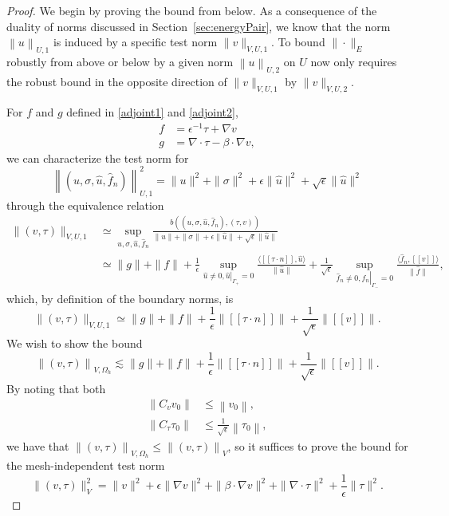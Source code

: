 \documentclass[11pt,onecolumn]{scrartcl}
\newcommand{\secref}[1]{\ref{sec:#1}}
\newcommand{\nor}[1]{\left\| #1 \right\|}
\newcommand{\LRs}[1]{\left[ #1 \right]}
\newcommand{\jump}[1] {\ensuremath{\LRs{\![#1]\!}}}
\newcommand{\Oh}{\Omega_h}
\newcommand{\grad}{\nabla}
\renewcommand{\div}{\grad \cdot}
\begin{document}
\begin{proof}
We begin by proving the bound from below. As a consequence of the duality of norms discussed in Section~\secref{energyPair}, we know that the norm $\left\| u \right\|_{U,1}$ is induced by a specific test norm $\| v  \|_{V,U,1}$.  To bound $\|\cdot\|_E$ robustly from above or below by a given norm $\left\| u \right\|_{U,2}$ on $U$ now only requires the robust bound in the opposite direction of $\| v \|_{V,U,1}$ by $\|v\|_{V,U,2}$. 

For $f$ and $g$ defined in \eqref{adjoint1} and \eqref{adjoint2},
\begin{align*}
f &= \epsilon^{-1}\tau + \grad v  \\
g &=\div \tau - \beta\cdot \grad v,
\end{align*} 
we can characterize the test norm for 
\[
\left\|\left(u,\sigma,\widehat{u},\widehat{f}_n\right)\right\|_{U,1}^2 = \|u\|^2 + \|\sigma\|^2 + \epsilon\|\widehat{u}\|^2+ \sqrt{\epsilon}\|\widehat{u}\|^2
\]
through the equivalence relation
\begin{align*}
\|\left(v,\tau\right)\|_{V,U,1} &\simeq \sup_{u,\sigma,\widehat{u},\widehat{f}_n}\frac{b\left(\left(u,\sigma,\widehat{u},\widehat{f}_n\right),\left(\tau,v\right)\right)}{\|u\| + \|\sigma\| + \epsilon\|\widehat{u}\|+ \sqrt{\epsilon}\|\widehat{u}\|}\\
& \simeq \|g\| + \|f\| + \frac{1}{\epsilon}\sup_{\widehat{u}\neq 0, \left.\widehat{u}\right|_{\Gamma_+} = 0} \frac{\langle \jump{\tau\cdot n}, \widehat{u}\rangle}{\|\widehat{u}\|} + \frac{1}{\sqrt{\epsilon}}\sup_{\widehat{f}_n\neq 0, \left.\widehat{f}_n\right|_{\Gamma_-}=0}\frac{\langle \widehat{f}_n, \jump{v}\rangle}{\|\widehat{f}\|},
\end{align*}
which, by definition of the boundary norms, is 
\[
\|\left(v,\tau\right)\|_{V,U,1} \simeq \|g\| + \|f\| + \frac{1}{\epsilon}\|\jump{\tau\cdot n}\| + \frac{1}{\sqrt{\epsilon}}\|\jump{v}\|.
\]
We wish to show the bound
\[
\nor{\left(v,\tau\right)}_{V,\Oh} \lesssim \|g\| + \|f\| + \frac{1}{\epsilon}\|\jump{\tau\cdot n}\| + \frac{1}{\sqrt{\epsilon}}\|\jump{v}\|.
\]
By noting that both 
\begin{align*}
\nor{C_vv_0} &\leq \nor{v_0},\\
\nor{C_\tau\tau_0} &\leq \frac{1}{\sqrt{\epsilon}}\nor{\tau_0},
\end{align*}
we have that $\nor{\left(v,\tau\right)}_{V,\Oh} \leq \nor{\left(v,\tau\right)}_{V}$, so it suffices to prove the bound for the mesh-independent test norm 
\[
\|\left(v,\tau\right)\|_{V}^2 = \|v\|^2 + \epsilon \|\grad v\|^2 + \|\beta \cdot \grad v\|^2 + \| \div \tau\|^2 + \frac{1}{\epsilon}\|\tau\|^2.
\]


\end{proof}
\end{document}
